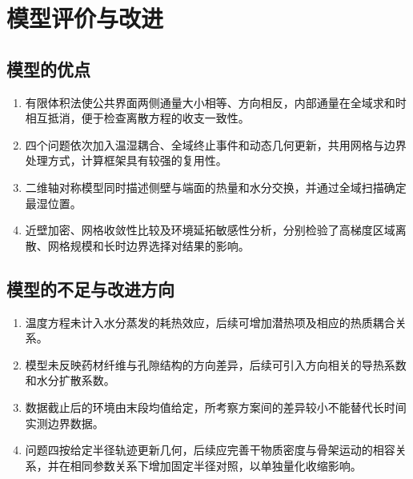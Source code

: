 \section{模型评价与改进}
\subsection{模型的优点}
\begin{enumerate}[label=\arabic*.]
\item 有限体积法使公共界面两侧通量大小相等、方向相反，内部通量在全域求和时相互抵消，便于检查离散方程的收支一致性。
\item 四个问题依次加入温湿耦合、全域终止事件和动态几何更新，共用网格与边界处理方式，计算框架具有较强的复用性。
\item 二维轴对称模型同时描述侧壁与端面的热量和水分交换，并通过全域扫描确定最湿位置。
\item 近壁加密、网格收敛性比较及环境延拓敏感性分析，分别检验了高梯度区域离散、网格规模和长时边界选择对结果的影响。

\end{enumerate}

\subsection{模型的不足与改进方向}
\begin{enumerate}[label=\arabic*.]
\item 温度方程未计入水分蒸发的耗热效应，后续可增加潜热项及相应的热质耦合关系。
\item 模型未反映药材纤维与孔隙结构的方向差异，后续可引入方向相关的导热系数和水分扩散系数。
\item 数据截止后的环境由末段均值给定，所考察方案间的差异较小不能替代长时间实测边界数据。
\item 问题四按给定半径轨迹更新几何，后续应完善干物质密度与骨架运动的相容关系，并在相同参数关系下增加固定半径对照，以单独量化收缩影响。
\end{enumerate}
